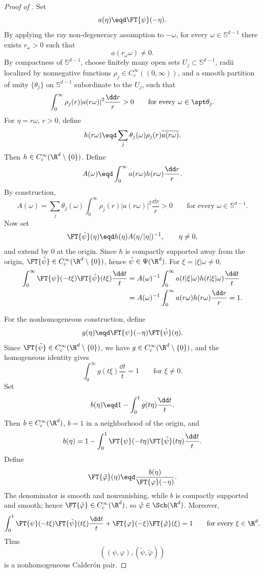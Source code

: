\begin{proof}[Proof of ] Set
\[
a(\eta)\eqd \FT{\psi}(-\eta).
\]
By applying the ray non-degeneracy assumption to \(-\omega\), for every \(\omega\in\mathbb{S}^{d-1}\) there exists \(r_\omega>0\) such that
\[
a(r_\omega\omega)\neq0.
\]
By compactness of \(\mathbb{S}^{d-1}\), choose finitely many open sets \(U_j\subset\mathbb{S}^{d-1}\), radii localized by nonnegative functions \(\rho_j\in C^\infty_c((0,\infty))\), and a smooth partition of unity \(\{\theta_j\}\) on \(\mathbb{S}^{d-1}\) subordinate to the \(U_j\), such that
\[
\int_0^\infty \rho_j(r)|a(r\omega)|^2\frac{\dd r}{r}>0
\qquad
\text{for every } \omega\in\spt \theta_j.
\]
For \(\eta=r\omega\), \(r>0\), define
\[
h(r\omega) \eqd \sum_j \theta_j(\omega)\rho_j(r)\overline{a(r\omega)}.
\]
Then \(h\in C^\infty_c(\R^d\setminus\{0\})\).
Define
\[
A(\omega) \eqd \int_0^\infty a(r\omega)h(r\omega)\frac{\dd r}{r}.
\]
By construction,
\[
A(\omega) = \sum_j \theta_j(\omega) \int_0^\infty \rho_j(r)|a(r\omega)|^2\frac{\dd r}{r} > 0 \qquad \text{for every } \omega\in\mathbb{S}^{d-1}.
\]
Now set
\[
\FT{\tilde{\psi}}(\eta) \eqd h(\eta)A(\eta/|\eta|)^{-1}, \qquad \eta\neq0,
\]
and extend by \(0\) at the origin.
Since \(h\) is compactly supported away from the origin, \(\FT{\tilde{\psi}}\in C^\infty_c(\R^d\setminus\{0\})\), hence \(\tilde{\psi}\in\Psi(\R^d)\).
For \(\xi=|\xi|\omega\neq0\),
\[
\begin{aligned}[t]
\int_0^\infty \FT{\psi}(-t\xi)\FT{\tilde{\psi}}(t\xi)\frac{\dd t}{t} & = A(\omega)^{-1} \int_0^\infty a(t|\xi|\omega)h(t|\xi|\omega)\frac{\dd t}{t}
\\
& = A(\omega)^{-1} \int_0^\infty a(r\omega)h(r\omega)\frac{\dd r}{r} = 1.
\end{aligned}
\]

For the nonhomogeneous construction, define
\[
g(\eta)\eqd \FT{\psi}(-\eta)\FT{\tilde{\psi}}(\eta).
\]
Since \(\FT{\tilde{\psi}}\in C^\infty_c(\R^d\setminus\{0\})\), we have \(g\in C^\infty_c(\R^d\setminus\{0\})\), and the homogeneous identity gives
\[
\int_0^\infty g(t\xi)\frac{\dd t}{t}=1 \qquad \text{for } \xi\neq0.
\]
Set
\[
b(\eta) \eqd 1-\int_0^1 g(t\eta)\frac{\dd t}{t}.
\]
Then \(b\in C^\infty_c(\R^d)\), \(b=1\) in a neighborhood of the origin, and
\[
b(\eta) = 1-\int_0^1 \FT{\psi}(-t\eta)\FT{\tilde{\psi}}(t\eta)\frac{\dd t}{t}.
\]
Define
\[
\FT{\tilde{\varphi}}(\eta) \eqd \frac{b(\eta)}{\FT{\varphi}(-\eta)}.
\]
The denominator is smooth and nonvanishing, while \(b\) is compactly supported and smooth; hence \(\FT{\tilde{\varphi}}\in C^\infty_c(\R^d)\), so \(\tilde{\varphi}\in\Sch(\R^d)\).
Moreover,
\[
\int_0^1 \FT{\psi}(-t\xi)\FT{\tilde{\psi}}(t\xi) \frac{\dd t}{t} + \FT{\varphi}(-\xi)\FT{\tilde{\varphi}}(\xi) = 1 \qquad \text{for every } \xi\in\R^d.
\]
Thus
\[
((\psi,\varphi),(\tilde{\psi},\tilde{\varphi}))
\]
is a nonhomogeneous Calder\'on pair.


\end{proof}
